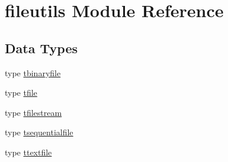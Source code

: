 \hypertarget{namespacefileutils}{}\section{fileutils Module Reference}
\label{namespacefileutils}
\subsection*{Data Types}
\begin{DoxyCompactItemize}
\item 
type \mbox{\hyperlink{structfileutils_1_1tbinaryfile}{tbinaryfile}}
\item 
type \mbox{\hyperlink{structfileutils_1_1tfile}{tfile}}
\item 
type \mbox{\hyperlink{structfileutils_1_1tfilestream}{tfilestream}}
\item 
type \mbox{\hyperlink{structfileutils_1_1tsequentialfile}{tsequentialfile}}
\item 
type \mbox{\hyperlink{structfileutils_1_1ttextfile}{ttextfile}}
\end{DoxyCompactItemize}
